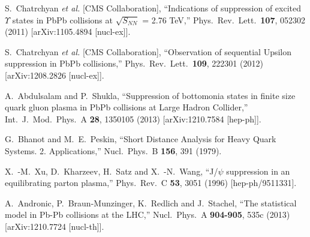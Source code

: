 \documentclass[aps,prc,preprint,superscriptaddress,showpacs,showkeys]{revtex4-1}
\begin{document}
\begin{thebibliography}{100}
  S.~Chatrchyan {\it et al.}  [CMS Collaboration],
  ``Indications of suppression of excited $\Upsilon$ states in PbPb collisions at $\sqrt{S_{NN}}$ = 2.76 TeV,''
  Phys.\ Rev.\ Lett.\  {\bf 107}, 052302 (2011)
  [arXiv:1105.4894 [nucl-ex]].


  S.~Chatrchyan {\it et al.}  [CMS Collaboration],
  ``Observation of sequential Upsilon suppression in PbPb collisions,''
  Phys.\ Rev.\ Lett.\  {\bf 109}, 222301 (2012)
  [arXiv:1208.2826 [nucl-ex]].


  A.~Abdulsalam and P.~Shukla,
  ``Suppression of bottomonia states in finite size quark gluon plasma in PbPb collisions at Large Hadron Collider,''
  Int.\ J.\ Mod.\ Phys.\ A {\bf 28}, 1350105 (2013)
  [arXiv:1210.7584 [hep-ph]].


  G.~Bhanot and M.~E.~Peskin,
  ``Short Distance Analysis for Heavy Quark Systems. 2. Applications,''
  Nucl.\ Phys.\ B {\bf 156}, 391 (1979).


  X.~-M.~Xu, D.~Kharzeev, H.~Satz and X.~-N.~Wang,
  ``J/$\psi$ suppression in an equilibrating parton plasma,''
  Phys.\ Rev.\ C {\bf 53}, 3051 (1996)
  [hep-ph/9511331].

  A.~Andronic, P.~Braun-Munzinger, K.~Redlich and J.~Stachel,
  ``The statistical model in Pb-Pb collisions at the LHC,''
  Nucl.\ Phys.\ A {\bf 904-905}, 535c (2013)
  [arXiv:1210.7724 [nucl-th]].


\end{thebibliography}
\end{document}

